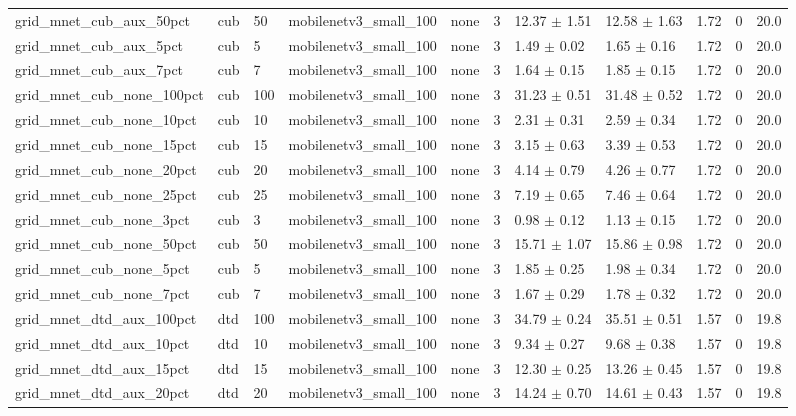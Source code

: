 \begin{tabular}{lllllllllll}
grid_mnet_cub_aux_50pct & cub & 50 & mobilenetv3_small_100 & none & 3 & 12.37 $\pm$ 1.51 & 12.58 $\pm$ 1.63 & 1.72 & 0 & 20.0 \\
grid_mnet_cub_aux_5pct & cub & 5 & mobilenetv3_small_100 & none & 3 & 1.49 $\pm$ 0.02 & 1.65 $\pm$ 0.16 & 1.72 & 0 & 20.0 \\
grid_mnet_cub_aux_7pct & cub & 7 & mobilenetv3_small_100 & none & 3 & 1.64 $\pm$ 0.15 & 1.85 $\pm$ 0.15 & 1.72 & 0 & 20.0 \\
grid_mnet_cub_none_100pct & cub & 100 & mobilenetv3_small_100 & none & 3 & 31.23 $\pm$ 0.51 & 31.48 $\pm$ 0.52 & 1.72 & 0 & 20.0 \\
grid_mnet_cub_none_10pct & cub & 10 & mobilenetv3_small_100 & none & 3 & 2.31 $\pm$ 0.31 & 2.59 $\pm$ 0.34 & 1.72 & 0 & 20.0 \\
grid_mnet_cub_none_15pct & cub & 15 & mobilenetv3_small_100 & none & 3 & 3.15 $\pm$ 0.63 & 3.39 $\pm$ 0.53 & 1.72 & 0 & 20.0 \\
grid_mnet_cub_none_20pct & cub & 20 & mobilenetv3_small_100 & none & 3 & 4.14 $\pm$ 0.79 & 4.26 $\pm$ 0.77 & 1.72 & 0 & 20.0 \\
grid_mnet_cub_none_25pct & cub & 25 & mobilenetv3_small_100 & none & 3 & 7.19 $\pm$ 0.65 & 7.46 $\pm$ 0.64 & 1.72 & 0 & 20.0 \\
grid_mnet_cub_none_3pct & cub & 3 & mobilenetv3_small_100 & none & 3 & 0.98 $\pm$ 0.12 & 1.13 $\pm$ 0.15 & 1.72 & 0 & 20.0 \\
grid_mnet_cub_none_50pct & cub & 50 & mobilenetv3_small_100 & none & 3 & 15.71 $\pm$ 1.07 & 15.86 $\pm$ 0.98 & 1.72 & 0 & 20.0 \\
grid_mnet_cub_none_5pct & cub & 5 & mobilenetv3_small_100 & none & 3 & 1.85 $\pm$ 0.25 & 1.98 $\pm$ 0.34 & 1.72 & 0 & 20.0 \\
grid_mnet_cub_none_7pct & cub & 7 & mobilenetv3_small_100 & none & 3 & 1.67 $\pm$ 0.29 & 1.78 $\pm$ 0.32 & 1.72 & 0 & 20.0 \\
grid_mnet_dtd_aux_100pct & dtd & 100 & mobilenetv3_small_100 & none & 3 & 34.79 $\pm$ 0.24 & 35.51 $\pm$ 0.51 & 1.57 & 0 & 19.8 \\
grid_mnet_dtd_aux_10pct & dtd & 10 & mobilenetv3_small_100 & none & 3 & 9.34 $\pm$ 0.27 & 9.68 $\pm$ 0.38 & 1.57 & 0 & 19.8 \\
grid_mnet_dtd_aux_15pct & dtd & 15 & mobilenetv3_small_100 & none & 3 & 12.30 $\pm$ 0.25 & 13.26 $\pm$ 0.45 & 1.57 & 0 & 19.8 \\
grid_mnet_dtd_aux_20pct & dtd & 20 & mobilenetv3_small_100 & none & 3 & 14.24 $\pm$ 0.70 & 14.61 $\pm$ 0.43 & 1.57 & 0 & 19.8 \\

\end{tabular}
